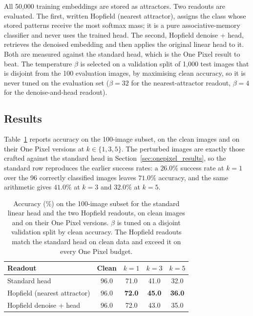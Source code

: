 All 50{,}000 training embeddings are stored as attractors. Two readouts are evaluated. The first, written Hopfield (nearest attractor), assigns the class whose stored patterns receive the most softmax mass; it is a pure associative-memory classifier and never uses the trained head. The second, Hopfield denoise + head, retrieves the denoised embedding and then applies the original linear head to it. Both are measured against the standard head, which is the One Pixel result to beat. The temperature $\beta$ is selected on a validation split of 1{,}000 test images that is disjoint from the 100 evaluation images, by maximising clean accuracy, so it is never tuned on the evaluation set ($\beta = 32$ for the nearest-attractor readout, $\beta = 4$ for the denoise-and-head readout).

\subsection{Results}

Table~\ref{tab:hopfield} reports accuracy on the 100-image subset, on the clean images and on their One Pixel versions at $k \in \{1, 3, 5\}$. The perturbed images are exactly those crafted against the standard head in Section~\ref{sec:onepixel_results}, so the standard row reproduces the earlier success rates: a $26.0\%$ success rate at $k=1$ over the 96 correctly classified images leaves $71.0\%$ accuracy, and the same arithmetic gives $41.0\%$ at $k=3$ and $32.0\%$ at $k=5$.

\begin{table}[ht]
    \centering
    \caption{Accuracy (\%) on the 100-image subset for the standard linear head and the two Hopfield readouts, on clean images and on their One Pixel versions. $\beta$ is tuned on a disjoint validation split by clean accuracy. The Hopfield readouts match the standard head on clean data and exceed it on every One Pixel budget.}
    \label{tab:hopfield}
    \begin{tabular}{lcccc}
        \toprule
        \textbf{Readout} & \textbf{Clean} & \textbf{$k=1$} & \textbf{$k=3$} & \textbf{$k=5$} \\
        \midrule
        Standard head & 96.0 & 71.0 & 41.0 & 32.0 \\
        Hopfield (nearest attractor) & 96.0 & \textbf{72.0} & \textbf{45.0} & \textbf{36.0} \\
        Hopfield denoise + head & 96.0 & 72.0 & 43.0 & 35.0 \\
        \bottomrule
    \end{tabular}
\end{table}

